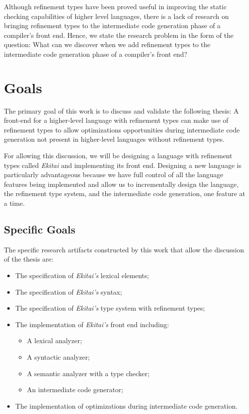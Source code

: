 \documentclass[
  oneside,
  english,
  coorientadorbanca,
  noabntexcite
]{ufsc-thesis-rn46-2019}
\begin{document}
Although refinement types have been proved useful in improving the static checking capabilities of higher level languages, there is a lack of research on bringing refinement types to the intermediate code generation phase of a compiler's front end.
Hence, we state the research problem in the form of the question: What can we discover when we add refinement types to the intermediate code generation phase of a compiler's front end?

\section{Goals}\label{chapter:introduction:sec:goals}

The primary goal of this work is to discuss and validate the following thesis: A front-end for a higher-level language with refinement types can make use of refinement types to allow optimizations opportunities during intermediate code generation not present in higher-level languages without refinement types.

For allowing this discussion, we will be designing a language with refinement types called \textit{Ekitai} and implementing its front end.
Designing a new language is particularly advantageous because we have full control of all the language features being implemented and allow us to incrementally design the language, the refinement type system, and the intermediate code generation, one feature at a time.

\subsection{Specific Goals}\label{chapter:introduction:sec:goals:specific_goals}
The specific research artifacts constructed by this work that allow the discussion of the thesis are:
\begin{itemize}
  \item The specification of \textit{Ekitai's} lexical elements;
  \item The specification of \textit{Ekitai's} syntax;
  \item The specification of \textit{Ekitai's} type system with refinement types;
  \item The implementation of \textit{Ekitai's} front end including:
        \begin{itemize}
          \item A lexical analyzer;
          \item A syntactic analyzer;
          \item A semantic analyzer with a type checker;
          \item An intermediate code generator;
        \end{itemize}
  \item The implementation of optimizations during intermediate code generation.
\end{itemize}
\end{document}
